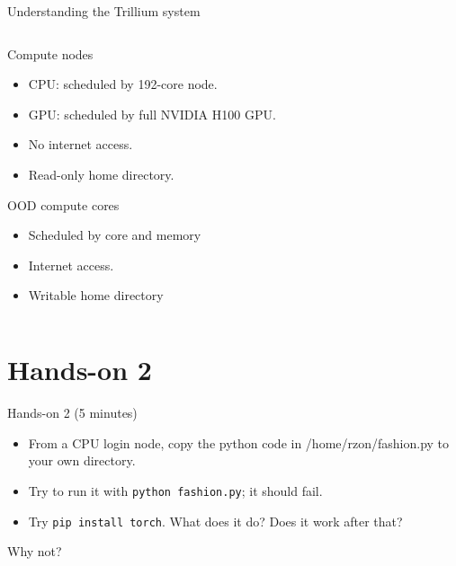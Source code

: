\documentclass[
  10pt,
  ignorenonframetext,
  aspectratio=169,handout]{beamer}
\providecommand{\tightlist}{%
  \setlength{\itemsep}{0pt}\setlength{\parskip}{0pt}}
\begin{document}
\begin{frame}{Understanding the Trillium system}
\begin{columns}[T]
\begin{column}{0.47\linewidth}
\begin{block}{Compute nodes}\setlength{\parskip}{0.5\baselineskip}
\label{compute-nodes-1}
\vspace{-1mm}

\begin{itemize}
\tightlist
\item
  CPU: scheduled by 192-core node.
\item
  GPU: scheduled by full NVIDIA H100 GPU.
\item
  No internet access.
\item
  Read-only home directory.
\end{itemize}
\end{block}

\begin{block}{OOD compute cores}\setlength{\parskip}{0.5\baselineskip}
\label{ood-compute-cores-1}
\vspace{-1mm}

\begin{itemize}
\tightlist
\item
  Scheduled by core and memory
\item
  Internet access.
\item
  Writable home directory
\end{itemize}
\end{block}
\end{column}
\end{columns}
\end{frame}

\section{Hands-on 2}\label{hands-on-2}

\begin{frame}[fragile]{Hands-on 2 (5 minutes)}
\label{hands-on-2-5-minutes}
\begin{itemize}
\item
  From a CPU login node, copy the python code in /home/rzon/fashion.py to your own directory.
\item
  Try to run it with \texttt{python\ fashion.py}; it should fail.
\item
  Try \texttt{pip\ install\ torch}. What does it do? Does it work after that?
\end{itemize}

Why not?
\end{frame}
\end{document}
